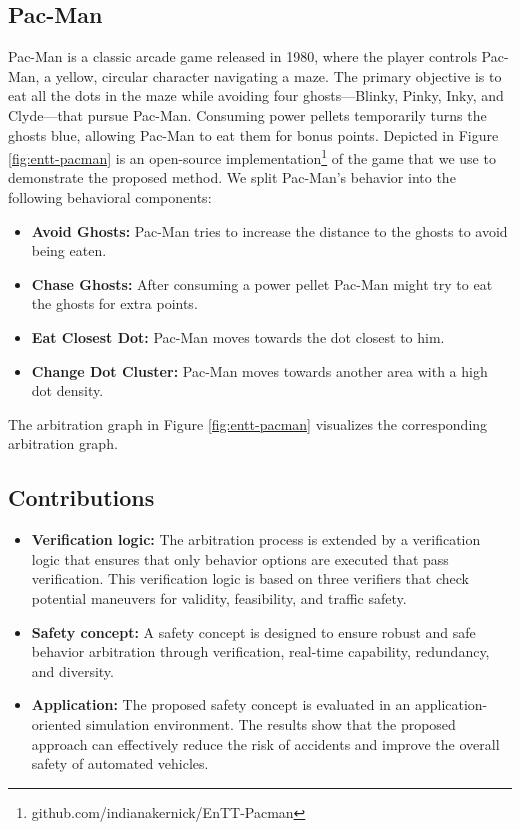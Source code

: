 \subsection{Pac-Man}

Pac-Man is a classic arcade game released in 1980, where the player controls Pac-Man, a yellow, circular character navigating a maze.
The primary objective is to eat all the dots in the maze while avoiding four ghosts—Blinky, Pinky, Inky, and Clyde—that pursue Pac-Man.
Consuming power pellets temporarily turns the ghosts blue, allowing Pac-Man to eat them for bonus points.
Depicted in Figure \ref{fig:entt-pacman} is an open-source implementation\footnote{github.com/indianakernick/EnTT-Pacman} of the game that we use to demonstrate the proposed method.
We split Pac-Man's behavior into the following behavioral components:

\begin{itemize}
    \item \textbf{Avoid Ghosts:} Pac-Man tries to increase the distance to the ghosts to avoid being eaten.
    \item \textbf{Chase Ghosts:} After consuming a power pellet Pac-Man might try to eat the ghosts for extra points.
    \item \textbf{Eat Closest Dot:} Pac-Man moves towards the dot closest to him.
    \item \textbf{Change Dot Cluster:} Pac-Man moves towards another area with a high dot density.
\end{itemize}

The arbitration graph in Figure \ref{fig:entt-pacman} visualizes the corresponding arbitration graph.

\subsection{Contributions}

\begin{itemize}
    \item \textbf{Verification logic:} The arbitration process is extended by a verification logic that ensures that only behavior options are executed that pass verification. This verification logic is based on three verifiers that check potential maneuvers for validity, feasibility, and traffic safety.
    \item \textbf{Safety concept:} A safety concept is designed to ensure robust and safe behavior arbitration through verification, real-time capability, redundancy, and diversity.
    \item \textbf{Application:} The proposed safety concept is evaluated in an application-oriented simulation environment. The results show that the proposed approach can effectively reduce the risk of accidents and improve the overall safety of automated vehicles.
\end{itemize}
